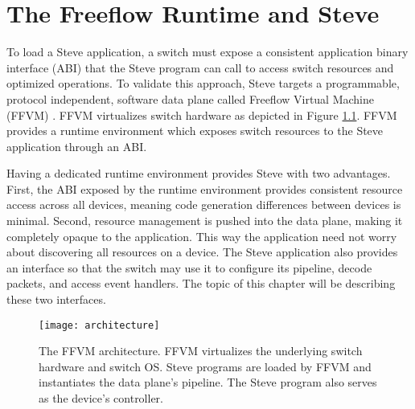 \chapter{The Freeflow Runtime and Steve} \label{ch:flowpath}

To load a Steve application, a switch must expose a consistent application binary interface (ABI) that the Steve program can call to access switch resources and optimized operations.
To validate this approach, Steve targets a programmable, protocol independent, software data plane called Freeflow Virtual Machine (FFVM) \cite{freeflow_software}. 
FFVM virtualizes switch hardware as depicted in Figure \ref{fig:architecture}. 
FFVM provides a runtime environment which exposes switch resources to the Steve application through an ABI. 

Having a dedicated runtime environment provides Steve with two advantages.
First, the ABI exposed by the runtime environment provides consistent resource access across all devices, meaning code generation differences between devices is minimal.
Second, resource management is pushed into the data plane, making it completely opaque to the application. This way the application need not worry about discovering all resources on a device.
The Steve application also provides an interface so that the switch may use it to configure its pipeline, decode packets, and access event handlers.
The topic of this chapter will be describing these two interfaces.



%
%

\begin{figure}[ht]
\centering
\texttt{[image: architecture]}
\caption{The FFVM architecture. FFVM virtualizes the underlying switch hardware and switch OS. Steve programs are loaded by FFVM and instantiates the data plane's pipeline. The Steve program also serves as the device's controller.}
\label{fig:architecture}
\end{figure}


